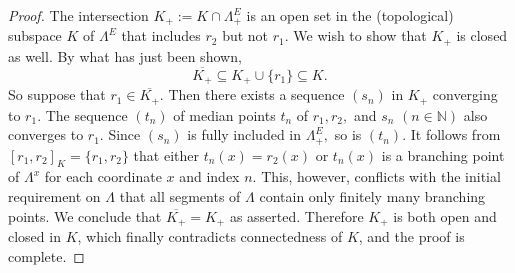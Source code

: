 \documentclass[10pt,a4paper]{amsart}
\begin{document}
\begin{proof}
The intersection ${K}_+:={K}\cap {\Lambda}^E_+$ is an open set in the (topological) subspace $K$ of $\Lambda^E$ that includes $r_2$ but not $r_1$.
We wish to show that ${K}_+$ is closed as well. By what has just been shown,
$$\overline{{K}_+}\subseteq {K}_+\cup \{ r_1\}\subseteq {K}.$$
So suppose that $r_1\in \overline{K_+}.$ Then there exists a sequence $(s_n)$ in $K_+$ converging to $r_1.$ The sequence $(t_n)$ of median points $t_n$ of
$r_1,r_2,$ and $s_n$ $(n\in {\mathbb N})$ also converges to $r_1.$ Since $(s_n)$ is fully included in ${\Lambda}^E_+,$ so is $(t_n).$ It follows from $[r_1,r_2]_{K}=\{ r_1,r_2\}$
that either $t_n(x)=r_2(x)$ or $t_n(x)$ is a branching point of $\Lambda^x$ for each coordinate $x$ and index $n$. This, however, conflicts with the initial requirement
on $\Lambda$ that all segments of $\Lambda$ contain only finitely many branching points. We conclude that $\overline{K_+}={K}_+$ as asserted. Therefore $K_+$ is
both open and closed in $K$, which finally contradicts connectedness of $K$, and the proof is complete.
\end{proof}
\end{document}
